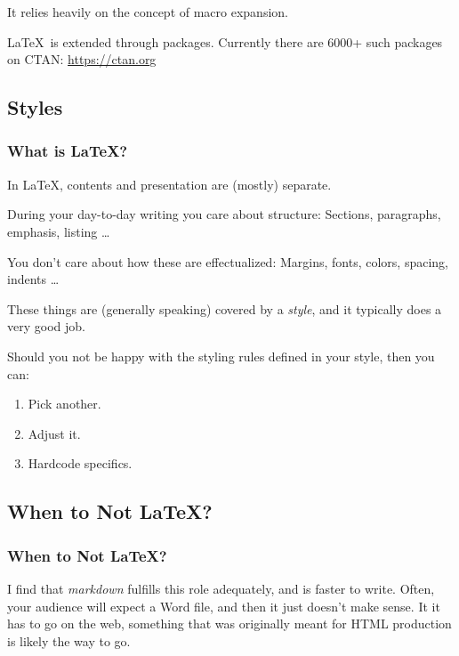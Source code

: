 {\begin{frame}[fragile]
  \vspace{5mm}
  It relies heavily on the concept of macro expansion.
  
  \vspace{5mm}
  \LaTeX\ is extended through packages. Currently there are 6000+ such packages on CTAN: \url{https://ctan.org}
\end{frame}

\subsection{Styles}
\begin{frame}[fragile]
  \frametitle{What is \LaTeX? }
  \vspace{3mm}
  In \LaTeX, contents and presentation are (mostly) separate.
  
  \vspace{5mm}
  During your day-to-day writing you care about structure: Sections, paragraphs, emphasis, listing \ldots
  
  \vspace{5mm}
  You don't care about how these are effectualized: Margins, fonts, colors, spacing, indents \ldots
  
  \vspace{5mm}
  These things are (generally speaking) covered by a \textsl{style}, and it typically does a very good job.
  
  \vspace{5mm}
  Should you not be happy with the styling rules defined in your style, then you can:
  \begin{enumerate}
    \item Pick another.
    \item Adjust it.
    \item Hardcode specifics.
  \end{enumerate}
\end{frame}

\subsection{When to Not \LaTeX?}
\begin{frame}[fragile]
  \frametitle{When to Not \LaTeX?}
  \vspace{3mm}
  \begin{itemize}
     I find that \textsl{markdown} fulfills this role adequately, and is faster to write.
     Often, your audience will expect a Word file, and then it just doesn't make sense.
     It it has to go on the web, something that was originally meant for HTML production is likely the way to go.
  \end{itemize}
\end{frame}

}

